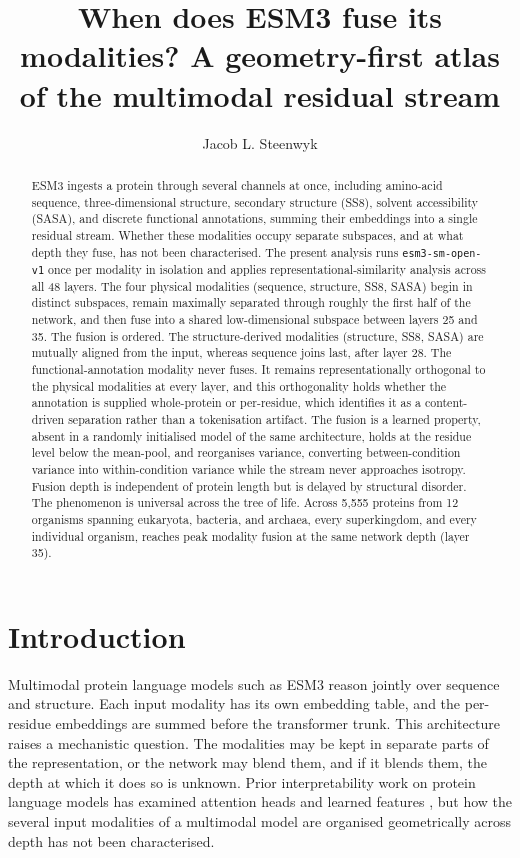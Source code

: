 \documentclass[11pt]{article}
\title{When does ESM3 fuse its modalities? A geometry-first atlas of the
multimodal residual stream}
\author[1]{Jacob L. Steenwyk}
\affil[1]{\small Affiliation to be completed}
\date{}
\begin{document}
\maketitle

\begin{abstract}
\noindent ESM3 ingests a protein through several channels at once, including
amino-acid sequence, three-dimensional structure, secondary structure (SS8),
solvent accessibility (SASA), and discrete functional annotations, summing their
embeddings into a single residual stream. Whether these modalities occupy separate
subspaces, and at what depth they fuse, has not been characterised. The present
analysis runs \texttt{esm3-sm-open-v1} once per modality in isolation and applies
representational-similarity analysis across all 48 layers. The four physical
modalities (sequence, structure, SS8, SASA) begin in distinct subspaces, remain
maximally separated through roughly the first half of the network, and then fuse
into a shared low-dimensional subspace between layers 25 and 35. The fusion is
ordered. The structure-derived modalities (structure, SS8, SASA) are mutually
aligned from the input, whereas sequence joins last, after layer 28. The
functional-annotation modality never fuses. It remains representationally
orthogonal to the physical modalities at every layer, and this orthogonality holds
whether the annotation is supplied whole-protein or per-residue, which identifies
it as a content-driven separation rather than a tokenisation artifact. The fusion
is a learned property, absent in a randomly initialised model of the same
architecture, holds at the residue level below the mean-pool, and reorganises
variance, converting between-condition variance into within-condition variance
while the stream never approaches isotropy. Fusion depth is independent of protein
length but is delayed by structural disorder. The phenomenon is universal across
the tree of life. Across 5,555 proteins from 12 organisms spanning eukaryota,
bacteria, and archaea, every superkingdom, and every individual organism, reaches
peak modality fusion at the same network depth (layer 35).
\end{abstract}

\section{Introduction}

Multimodal protein language models such as ESM3 \cite{hayes2024} reason jointly over
sequence and structure. Each input modality has its own embedding table, and the
per-residue embeddings are summed before the transformer trunk. This architecture
raises a mechanistic question. The modalities may be kept in separate parts of the
representation, or the network may blend them, and if it blends them, the depth at
which it does so is unknown. Prior interpretability work on protein language models
has examined attention heads and learned features \cite{vig2021,rao2019,gujral2024,
cunningham2023}, but how the several input modalities of a multimodal model are
organised geometrically across depth has not been characterised.
\end{document}
